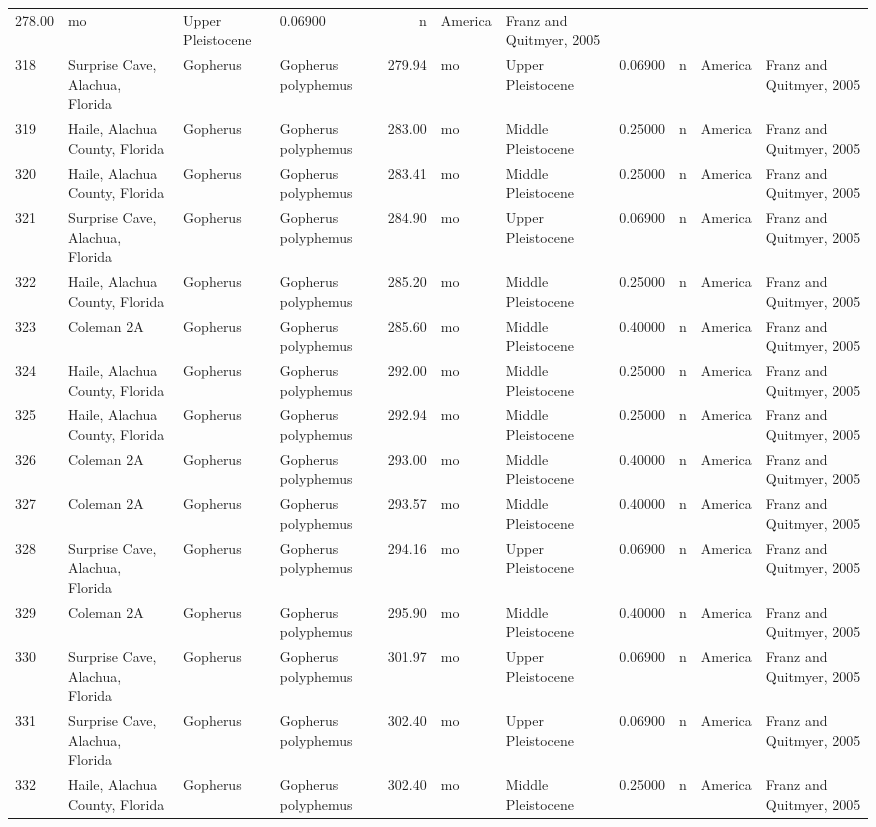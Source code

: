 \begin{landscape}
{\begin{longtable}[]{@{}llllrllrlll@{}}
	278.00 & mo & Upper Pleistocene & 0.06900 & n & America & Franz and
	Quitmyer, 2005\tabularnewline
	318 & Surprise Cave, Alachua, Florida & Gopherus & Gopherus polyphemus &
	279.94 & mo & Upper Pleistocene & 0.06900 & n & America & Franz and
	Quitmyer, 2005\tabularnewline
	319 & Haile, Alachua County, Florida & Gopherus & Gopherus polyphemus &
	283.00 & mo & Middle Pleistocene & 0.25000 & n & America & Franz and
	Quitmyer, 2005\tabularnewline
	320 & Haile, Alachua County, Florida & Gopherus & Gopherus polyphemus &
	283.41 & mo & Middle Pleistocene & 0.25000 & n & America & Franz and
	Quitmyer, 2005\tabularnewline
	321 & Surprise Cave, Alachua, Florida & Gopherus & Gopherus polyphemus &
	284.90 & mo & Upper Pleistocene & 0.06900 & n & America & Franz and
	Quitmyer, 2005\tabularnewline
	322 & Haile, Alachua County, Florida & Gopherus & Gopherus polyphemus &
	285.20 & mo & Middle Pleistocene & 0.25000 & n & America & Franz and
	Quitmyer, 2005\tabularnewline
	323 & Coleman 2A & Gopherus & Gopherus polyphemus & 285.60 & mo & Middle
	Pleistocene & 0.40000 & n & America & Franz and Quitmyer,
	2005\tabularnewline
	324 & Haile, Alachua County, Florida & Gopherus & Gopherus polyphemus &
	292.00 & mo & Middle Pleistocene & 0.25000 & n & America & Franz and
	Quitmyer, 2005\tabularnewline
	325 & Haile, Alachua County, Florida & Gopherus & Gopherus polyphemus &
	292.94 & mo & Middle Pleistocene & 0.25000 & n & America & Franz and
	Quitmyer, 2005\tabularnewline
	326 & Coleman 2A & Gopherus & Gopherus polyphemus & 293.00 & mo & Middle
	Pleistocene & 0.40000 & n & America & Franz and Quitmyer,
	2005\tabularnewline
	327 & Coleman 2A & Gopherus & Gopherus polyphemus & 293.57 & mo & Middle
	Pleistocene & 0.40000 & n & America & Franz and Quitmyer,
	2005\tabularnewline
	328 & Surprise Cave, Alachua, Florida & Gopherus & Gopherus polyphemus &
	294.16 & mo & Upper Pleistocene & 0.06900 & n & America & Franz and
	Quitmyer, 2005\tabularnewline
	329 & Coleman 2A & Gopherus & Gopherus polyphemus & 295.90 & mo & Middle
	Pleistocene & 0.40000 & n & America & Franz and Quitmyer,
	2005\tabularnewline
	330 & Surprise Cave, Alachua, Florida & Gopherus & Gopherus polyphemus &
	301.97 & mo & Upper Pleistocene & 0.06900 & n & America & Franz and
	Quitmyer, 2005\tabularnewline
	331 & Surprise Cave, Alachua, Florida & Gopherus & Gopherus polyphemus &
	302.40 & mo & Upper Pleistocene & 0.06900 & n & America & Franz and
	Quitmyer, 2005\tabularnewline
	332 & Haile, Alachua County, Florida & Gopherus & Gopherus polyphemus &
	302.40 & mo & Middle Pleistocene & 0.25000 & n & America & Franz and
	Quitmyer, 2005\tabularnewline

\end{longtable}}
\end{landscape}
